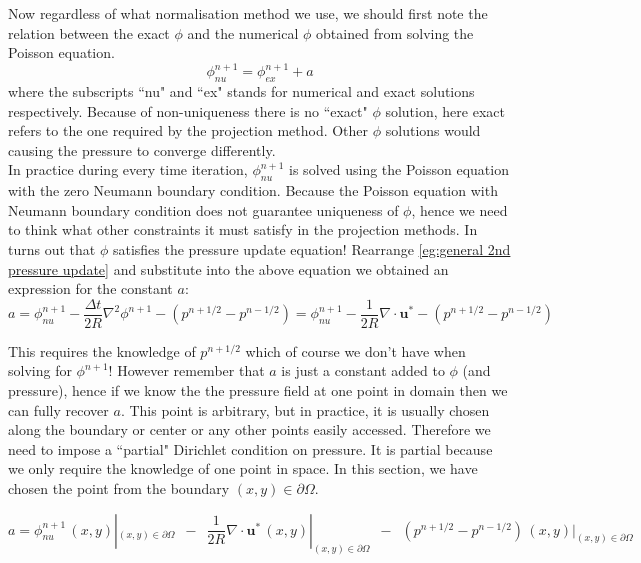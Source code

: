 Now regardless of what normalisation method we use, we should first note the relation between the exact $\phi$ and the numerical $\phi$ obtained from solving the Poisson equation.
\begin{equation}
\phi^{n+1}_{nu} = \phi^{n+1}_{ex} + a
\end{equation}
where the subscripts ``nu" and ``ex" stands for numerical and exact solutions respectively. Because of non-uniqueness there is no ``exact" $\phi$ solution, here exact refers to the one required by the projection method. Other $\phi$ solutions would causing the pressure to converge differently.\\

In practice during every time iteration, $\phi^{n+1}_{nu}$ is solved using the Poisson equation with the zero Neumann boundary condition. Because the Poisson equation with Neumann boundary condition does not guarantee uniqueness of $\phi$, hence we need to think what other constraints it must satisfy in the projection methods. In turns out that $\phi$ satisfies the pressure update equation! Rearrange \eqref{eg:general 2nd pressure update} and substitute into the above equation we obtained an expression for the constant $a$:
\begin{dmath}
a = \phi^{n+1}_{nu} - \dfrac{\Delta t}{2R} \nabla^2 \phi^{n+1} - (p^{n+1/2} - p^{n-1/2})
= \phi^{n+1}_{nu} - \dfrac{1}{2R} \nabla \cdot \textbf{u}^* - (p^{n+1/2} - p^{n-1/2})
\end{dmath}

This requires the knowledge of $p^{n+1/2}$ which of course we don't have when solving for $\phi^{n+1}$! However remember that $a$ is just a constant added to $\phi$ (and pressure), hence if we know the the pressure field at one point in domain then we can fully recover $a$. This point is arbitrary, but in practice, it is usually chosen along the boundary or center or any other points easily accessed. Therefore we need to impose a ``partial" Dirichlet condition on pressure. It is partial because we only require the knowledge of one point in space. In this section, we have chosen the point from the boundary $(x,y) \in \partial \Omega$.

\begin{equation}
a = \phi^{n+1}_{nu}\,(x,y)|_{(x,y)\in \partial\Omega} \,\,\,-\,\,\, \dfrac{1}{2R} \nabla \cdot \textbf{u}^*\,(x,y)|_{(x,y)\in \partial\Omega}\,\,\, -\,\,\, (p^{n+1/2} - p^{n-1/2})\,(x,y)|_{(x,y)\in \partial\Omega}
\end{equation}

